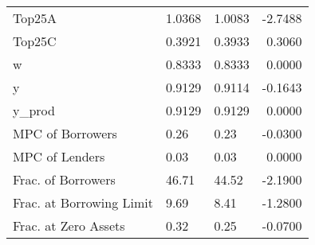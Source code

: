 \begin{table}
\begin{tabular}{lllr}
                  Top25A &  1.0368 &   1.0083 & -2.7488 \\
                  Top25C &  0.3921 &   0.3933 &  0.3060 \\
                       w &  0.8333 &   0.8333 &  0.0000 \\
                       y &  0.9129 &   0.9114 & -0.1643 \\
                  y\_prod &  0.9129 &   0.9129 &  0.0000 \\
        MPC of Borrowers &    0.26 &     0.23 & -0.0300 \\
          MPC of Lenders &    0.03 &     0.03 &  0.0000 \\
      Frac. of Borrowers &   46.71 &    44.52 & -2.1900 \\
Frac. at Borrowing Limit &    9.69 &     8.41 & -1.2800 \\
    Frac. at Zero Assets &    0.32 &     0.25 & -0.0700 \\
\bottomrule
\end{tabular}
\end{table}
